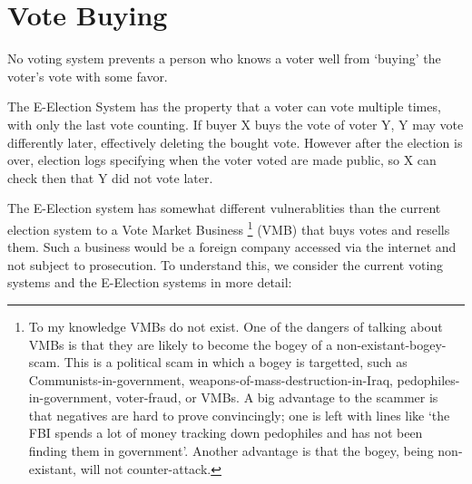 \documentclass[12pt]{article}
\begin{document}
\section{Vote Buying}

No voting system prevents a person who knows a voter well from
`buying' the voter's vote with some favor.

The E-Election System has the property that a voter
can vote multiple times, with only the last vote counting.
If buyer X buys the vote of voter Y, Y may vote differently
later, effectively deleting the bought vote.  However after
the election is over, election logs specifying when the voter
voted are made public, so X can check then that Y did not
vote later.

The E-Election system has somewhat different vulnerablities than the current
election system to a Vote Market Business%
\footnote{To my knowledge VMBs do not exist.
One of the dangers of talking about VMBs is that they
are likely to become the bogey of a non-existant-bogey-scam.  This is
a political scam in which a bogey is targetted, such as
Communists-in-government, weapons-of-mass-destruction-in-Iraq,
pedophiles-in-government, voter-fraud, or VMBs.
A big advantage to the scammer is that negatives are hard to prove
convincingly; one is left with lines like `the FBI spends a
lot of money tracking down pedophiles and has not been finding
them in government'.  Another advantage is that the bogey, being
non-existant, will not counter-attack.}%
(VMB) that buys
votes and resells them.  Such a business would be a foreign
company accessed via the internet and not subject to prosecution.
To understand this, we consider the current voting systems
and the E-Election systems in more detail:
\end{document}
